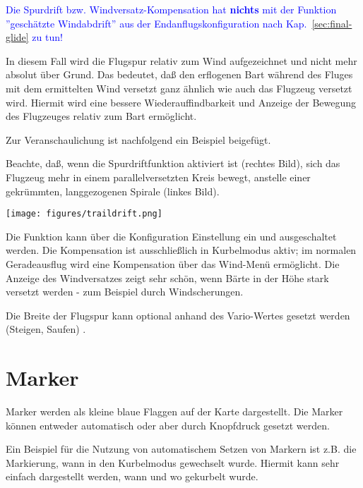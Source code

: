  \textcolor{blue}{ Die Spurdrift bzw. Windversatz-Kompensation hat \textbf{nichts}  mit der Funktion ''geschätzte Windabdrift'' \achtung aus der Endanflugskonfiguration nach Kap.~\ref{sec:final-glide} zu tun!}
 
In diesem Fall wird die Flugspur relativ zum Wind aufgezeichnet und nicht mehr absolut über Grund. Das bedeutet, daß  \xc den erflogenen Bart während des Fluges mit dem ermittelten Wind versetzt ganz ähnlich wie auch das Flugzeug versetzt wird. Hiermit wird eine bessere Wiederauffindbarkeit und  Anzeige der Bewegung des Flugzeuges relativ zum Bart ermöglicht.

Zur Veranschaulichung ist nachfolgend ein Beispiel beigefügt. 

Beachte, daß, wenn die Spurdriftfunktion aktiviert ist (rechtes Bild), sich das Flugzeug mehr in einem parallelversetzten Kreis  bewegt, anstelle einer gekrümmten, langgezogenen Spirale (linkes Bild).

\begin{center}
\texttt{[image: figures/traildrift.png]}
\end{center}

 Die Funktion  kann über die Konfiguration Einstellung ein und ausgeschaltet werden.  Die Kompensation ist ausschließlich in Kurbelmodus aktiv; im normalen Geradeausflug wird eine Kompensation über das Wind-Menü ermöglicht.
Die Anzeige des Windversatzes zeigt sehr schön, wenn Bärte in der Höhe stark versetzt werden - zum Beispiel durch Windscherungen.

Die Breite der Flugspur  kann optional anhand des Vario-Wertes gesetzt werden (Steigen, Saufen) .
\section{Marker}

Marker werden als kleine blaue Flaggen auf der Karte dargestellt. 
Die Marker können entweder automatisch oder aber durch Knopfdruck gesetzt werden.

Ein Beispiel für die Nutzung von automatischem Setzen von Markern ist z.B. die 
Markierung, wann in den Kurbelmodus gewechselt wurde. Hiermit kann sehr einfach dargestellt werden, wann und wo gekurbelt wurde.

